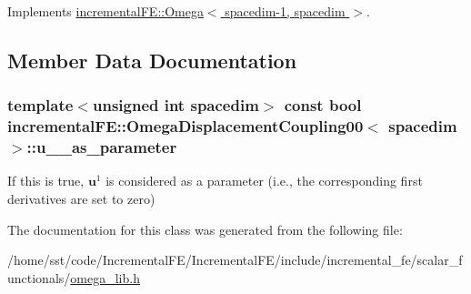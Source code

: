 Implements \hyperlink{classincremental_f_e_1_1_omega_a2f35d862aefa11151de5b7c7411e45df}{incremental\+F\+E\+::\+Omega$<$ spacedim-\/1, spacedim $>$}.



\subsection{Member Data Documentation}
\subsubsection[{\texorpdfstring{u\+\_\+1\+\_\+as\+\_\+parameter}{u_1_as_parameter}}]{\setlength{\rightskip}{0pt plus 5cm}template$<$unsigned int spacedim$>$ const bool {\bf incremental\+F\+E\+::\+Omega\+Displacement\+Coupling00}$<$ spacedim $>$\+::u\+\_\+\_\+as\+\_\+parameter\hspace{0.3cm}{\ttfamily [private]}}\hypertarget{classincremental_f_e_1_1_omega_displacement_coupling00_a1dc29cbc64a8477b06f1a01472783e5e}{}\label{classincremental_f_e_1_1_omega_displacement_coupling00_a1dc29cbc64a8477b06f1a01472783e5e}
If this is {\ttfamily true}, $\boldsymbol{u}^1$ is considered as a parameter (i.\+e., the corresponding first derivatives are set to zero) 

The documentation for this class was generated from the following file\+:\begin{DoxyCompactItemize}
\item 
/home/sst/code/\+Incremental\+F\+E/\+Incremental\+F\+E/include/incremental\+\_\+fe/scalar\+\_\+functionals/\hyperlink{omega__lib_8h}{omega\+\_\+lib.\+h}\end{DoxyCompactItemize}
